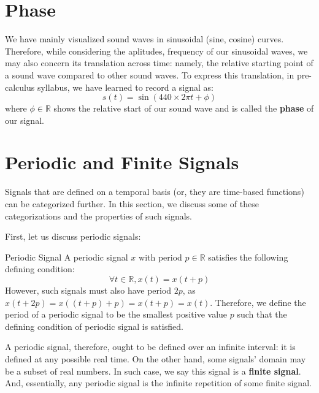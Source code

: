 \section{Phase}
We have mainly visualized sound waves in sinusoidal (sine, cosine) curves.
Therefore, while considering the aplitudes, frequency of our sinusoidal waves, we may also concern its translation across time: namely, the relative starting point of a sound wave compared to other sound waves.
To express this translation, in pre-calculus syllabus, we have learned to record a signal as:
\[
    s(t) = \sin (440 \times 2 \pi t + \phi)
\]
where $\phi \in \mathbb{R}$ shows the relative start of our sound wave and is called the \textbf{phase} of our signal.

\section{Periodic and Finite Signals}
Signals that are defined on a temporal basis (or, they are time-based functions) can be categorized further.
In this section, we discuss some of these categorizations and the properties of such signals.

First, let us discuss periodic signals:
\begin{ln-define}{Periodic Signal}{}
    A periodic signal $x$ with period $p \in \mathbb{R}$ satisfies the following defining condition:
    \[
        \forall t \in \mathbb{R}, x(t) = x(t + p)
    \]
    However, such signals must also have period $2p$, as $x(t + 2p) = x((t+p) + p) = x(t+p) = x(t)$.
    Therefore, we define the period of a periodic signal to be the smallest positive value $p$ such that the defining condition of periodic signal is satisfied.
\end{ln-define}

A periodic signal, therefore, ought to be defined over an infinite interval: it is defined at any possible real time.
On the other hand, some signals' domain may be a subset of real numbers.
In such case, we say this signal is a \textbf{finite signal}.
And, essentially, any periodic signal is the infinite repetition of some finite signal.

